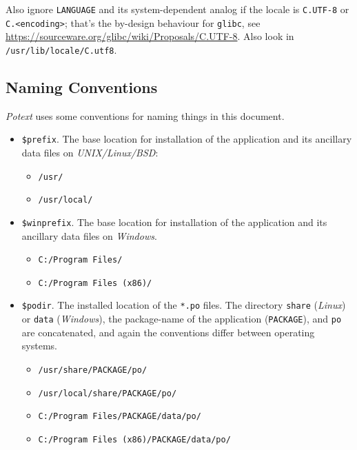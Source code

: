 \documentclass[
 11pt,
 twoside,
 a4paper,
 final                                 %
]{article}
\begin{document}
   Also ignore \texttt{LANGUAGE} and its system-dependent analog if the
   locale is \texttt{C.UTF-8} or \texttt{C.<encoding>}; that's
   the by-design behaviour for \texttt{glibc}, see
   \url{https://sourceware.org/glibc/wiki/Proposals/C.UTF-8}.
   Also look in \texttt{/usr/lib/locale/C.utf8}.

\subsection{Naming Conventions}
\label{subsec:introduction_conventions}

   \textsl{Potext} uses some conventions for naming things in this
   document.

   \begin{itemize}
      \item \texttt{\$prefix}. The base location for installation of
         the application and its ancillary data files on
         \textsl{UNIX/Linux/BSD}:
         \begin{itemize}
            \item \texttt{/usr/}
            \item \texttt{/usr/local/}
         \end{itemize}
      \item \texttt{\$winprefix}. The base location for installation of
         the application and its ancillary data files on \textsl{Windows}.
         \begin{itemize}
            \item \texttt{C:/Program Files/}
            \item \texttt{C:/Program Files (x86)/}
         \end{itemize}
      \item \texttt{\$podir}. The installed location of the \texttt{*.po}
         files.  The directory \texttt{share} (\textsl{Linux}) or
         \texttt{data} (\textsl{Windows}),
         the package-name of the application
         (\texttt{PACKAGE}), and \texttt{po} are concatenated,
         and again the conventions differ between operating systems.
         \begin{itemize}
            \item \texttt{/usr/share/PACKAGE/po/}
            \item \texttt{/usr/local/share/PACKAGE/po/}
            \item \texttt{C:/Program Files/PACKAGE/data/po/}
            \item \texttt{C:/Program Files (x86)/PACKAGE/data/po/}

\end{itemize}
\end{itemize}
\end{document}
